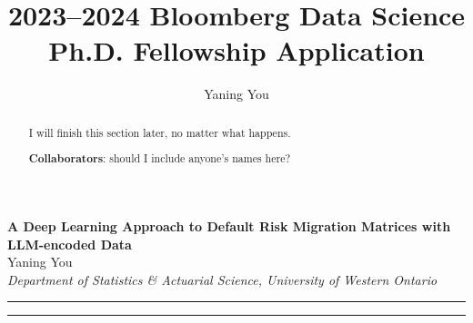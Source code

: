 \documentclass[10pt]{article}
\author{Yaning You}
\title{2023--2024 Bloomberg Data Science Ph.D. Fellowship Application}
\begin{document}
	
	\begin{center}
		{\Large \textbf{A Deep Learning Approach to Default Risk Migration Matrices with LLM-encoded Data}}\\
		\vspace{1em}
		{\large Yaning You}\\
		\vspace{1em}
		\textit{Department of Statistics \& Actuarial Science, University of Western Ontario}
	\end{center}
	

	\begin{center}
		\rule{150mm}{0.2mm}
	\end{center}		

	\begin{abstract}
	
	I will finish this section later, no matter what happens.
	
	\textbf{Collaborators}: should I include anyone's names here?
	\end{abstract}

	\begin{center}
		\rule{150mm}{0.2mm}
	\end{center}		

	\vspace{5mm}
	
\end{document}
